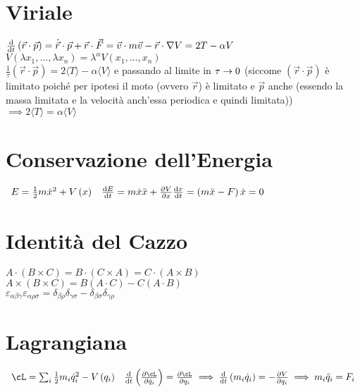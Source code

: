 \documentclass[a4paper,NoNotes,GeneralMath,12pt]{stdmdoc}
\begin{document}
	\section*{Viriale}
	$\de{}{t} \left(\vec{r} \cdot \vec{p}\right) = \dot{\vec{r}} \cdot \vec{p} + \vec{r} \cdot \vec{F} = \vec{v} \cdot m\vec{v} - \vec{r} \cdot \nabla V = 2T - \alpha V$ \\ $V\left(\lambda x_1, \ldots, \lambda x_n\right) = \lambda^\alpha V\left(x_1, \ldots, x_n\right)$ \\ $\frac{1}{\tau}\left(\vec{r}\cdot\vec{p}\right) = 2 \langle T \rangle - \alpha \langle V \rangle$ e passando al limite in $\tau \rightarrow 0$ (siccome $\left(\vec{r}\cdot\vec{p}\right)$ è limitato poiché per ipotesi il moto (ovvero $\vec{r}$) è limitato e $\vec{p}$ anche (essendo la massa limitata e la velocità anch'essa periodica e quindi limitata)) $\implies 2 \langle T \rangle = \alpha \langle V \rangle$

	\section*{Conservazione dell'Energia}
	$\begin{array}{cc} E = \frac{1}{2} m {\dot{x}}^2 + V\left(x\right) & \de{E}{t} = m\dot{x}\ddot{x} + \dpar{V}{x} \de{x}{t} = \left(m \ddot{x} - F\right) \dot{x} = 0 \end{array}$

	\section*{Identità del Cazzo}
	$A \cdot \left(B \times C\right) = B \cdot \left(C \times A\right) = C \cdot \left(A \times B\right)$ \\ $A \times \left(B \times C\right) = B\left(A \cdot C\right) - C \left(A \cdot B\right)$ \\ $\varepsilon_{\alpha\beta\gamma} \varepsilon_{\alpha\rho\sigma} = \delta_{\beta\rho}\delta_{\gamma\sigma} - \delta_{\beta\sigma}\delta_{\gamma\rho}$

	\section*{Lagrangiana}
	$\begin{array}{cc} \cL = \sum_i \frac{1}{2} m_i {\dot{q}}_i^2 - V\left(q_i\right) & \de{}{t}\left(\dpar{\cL}{\dot{q}_i}\right) = \dpar{\cL}{q_i} \implies \de{}{t}\left(m_i {\dot{q}_i}\right) = - \dpar{V}{q_i} \implies m_i {\ddot{q}_i} = F_i \end{array}$
\end{document}
